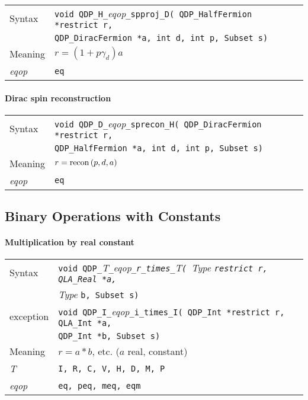\documentclass{article}
\newcommand{\tInt}{QDP\ttdash Int }
\newcommand{\tHalfFermion}{QDP\ttdash HalfFermion }
\newcommand{\tDiracFermion}{QDP\ttdash DiracFermion }
\newcommand{\tqlaReal}{QLA\ttdash Real }
\newcommand{\tqlaInt}{QLA\ttdash Int }
\newcommand{\namespace}{QDP}
\newcommand{\allEqOps}{{\tt eq, peq, meq, eqm}}
\newcommand{\allNumericTypes}{{\tt I, R, C, V, H, D, M, P}}
\newcommand{\ttdash}{{\tt \_}}
\newcommand{\itt}{\it T}
\newcommand{\extraarg}{, Subset s}
\begin{document}
\begin{flushleft}
  \begin{tabular}{|l|l|}
  \hline
  Syntax      & {\tt void \namespace}\ttdash{\tt H}\ttdash{\it eqop}\ttdash{\tt spproj}\ttdash{\tt D( \tHalfFermion *restrict r,}\\
              & {\tt \tDiracFermion *a, int d, int p\extraarg)} \\
  \hline
  Meaning     & $r = (1 + p\gamma_d)a$\\
  \hline
  {\it eqop}  & {\tt eq} \\
  \hline
  \end{tabular}
\end{flushleft}

\paragraph{Dirac spin reconstruction}

\begin{flushleft}
  \begin{tabular}{|l|l|}
  \hline
  Syntax      & {\tt void \namespace}\ttdash{\tt D}\ttdash{\it eqop}\ttdash{\tt sprecon}\ttdash{\tt H( \tDiracFermion *restrict r,}\\
              & {\tt \tHalfFermion *a, int d, int p\extraarg)} \\
  \hline
  Meaning     & $r = {\rm recon\,}(p,d,a)$\\
  \hline
  {\it eqop}  & {\tt eq} \\
  \hline
  \end{tabular}
\end{flushleft}

\subsection{Binary Operations with Constants}

\paragraph{Multiplication by real constant}

\begin{flushleft}
  \begin{tabular}{|l|l|}
  \hline
  Syntax      & {\tt void \namespace}\ttdash\itt\ttdash{\it eqop}\ttdash{\tt r}\ttdash{\tt times}\ttdash\itt{\tt ( }{\it Type }{\tt *restrict r, \tqlaReal *a,}\\
              & {\it Type }{\tt *b\extraarg)} \\
  exception    & {\tt void \namespace}\ttdash{\tt I}\ttdash{\it eqop}\ttdash{\tt i}\ttdash{\tt times}\ttdash{\tt I( \tInt *restrict r, \tqlaInt *a,}\\
              & {\tt \tInt *b\extraarg)} \\
  \hline
  Meaning     & $r = a*b$, etc. ($a$ real, constant)
$
$\\
  \hline
  \itt     & \allNumericTypes \\
  \hline
  {\it eqop}  & \allEqOps \\
  \hline
  \end{tabular}
\end{flushleft}
\end{document}
